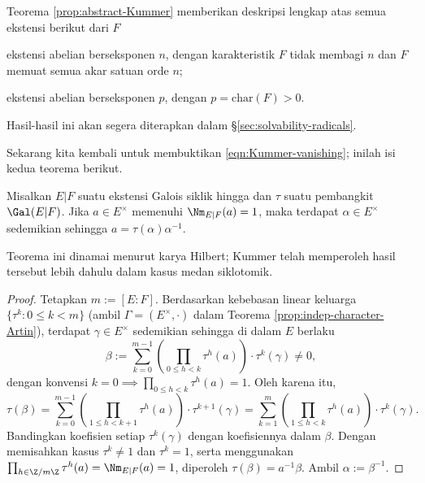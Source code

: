 Teorema \ref{prop:abstract-Kummer} memberikan deskripsi lengkap atas semua ekstensi berikut dari $F$
\begin{inparaenum}[(a)]
	\item ekstensi abelian berseksponen $n$, dengan karakteristik $F$ tidak membagi $n$ dan $F$ memuat semua akar satuan orde $n$;
	\item ekstensi abelian berseksponen $p$, dengan $p = \text{char}(F) > 0$.
\end{inparaenum}
Hasil-hasil ini akan segera diterapkan dalam \S\ref{sec:solvability-radicals}.

Sekarang kita kembali untuk membuktikan \eqref{eqn:Kummer-vanishing}; inilah isi kedua teorema berikut.

\begin{theorem}\label{prop:Hilbert-90-multiplicative}
	Misalkan $E|F$ suatu ekstensi Galois siklik hingga dan $\tau$ suatu pembangkit $\Gal(E|F)$. Jika $a \in E^\times$ memenuhi $\Nm_{E|F}(a)=1$, maka terdapat $\alpha \in E^\times$ sedemikian sehingga $a = \tau(\alpha)\alpha^{-1}$.
\end{theorem}
Teorema ini dinamai menurut \cite[\S 54, Satz 90]{Hilb94} karya Hilbert; Kummer telah memperoleh hasil tersebut lebih dahulu dalam kasus medan siklotomik.
\begin{proof}
	Tetapkan $m := [E:F]$. Berdasarkan kebebasan linear keluarga $\{\tau^k : 0 \leq k < m \}$ (ambil $\Gamma = (E^\times, \cdot)$ dalam Teorema \ref{prop:indep-character-Artin}), terdapat $\gamma \in E^\times$ sedemikian sehingga di dalam $E$ berlaku
	\[ \beta := \sum_{k=0}^{m-1} \left( \prod_{0 \leq h < k} \tau^h(a) \right) \cdot \tau^k(\gamma) \neq 0, \]
	dengan konvensi $k=0 \implies \prod_{0 \leq h < k} \tau^h(a) = 1$. Oleh karena itu,
	\[ \tau(\beta) = \sum_{k=0}^{m-1} \left( \prod_{1 \leq h < k+1} \tau^h(a) \right) \cdot \tau^{k+1}(\gamma) = \sum_{k=1}^m \left( \prod_{1 \leq h < k} \tau^h(a) \right) \cdot \tau^k(\gamma). \]
	Bandingkan koefisien setiap $\tau^k(\gamma)$ dengan koefisiennya dalam $\beta$. Dengan memisahkan kasus $\tau^k \neq 1$ dan $\tau^k=1$, serta menggunakan $\prod_{h \in \Z/m\Z} \tau^h(a) = \Nm_{E|F}(a) = 1$, diperoleh $\tau(\beta)=a^{-1}\beta$. Ambil $\alpha := \beta^{-1}$.
\end{proof}

